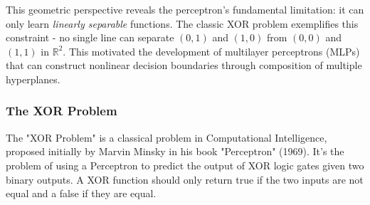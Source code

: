 \documentclass{article}
\begin{document}
This geometric perspective reveals the perceptron's fundamental limitation: it can only learn \textit{linearly separable} functions. The classic XOR problem exemplifies this constraint - no single line can separate $(0,1)$ and $(1,0)$ from $(0,0)$ and $(1,1)$ in $\mathbb{R}^2$. This motivated the development of multilayer perceptrons (MLPs) that can construct nonlinear decision boundaries through composition of multiple hyperplanes.

\subsubsection{The XOR Problem}

The "XOR Problem" is a classical problem in Computational Intelligence, proposed initially by Marvin Minsky in his book "Perceptron" (1969). It's the problem of using a Perceptron to predict the output of XOR logic gates given two binary outputs. A XOR function should only return true if the two inputs are not equal and a false if they are equal.
\end{document}
